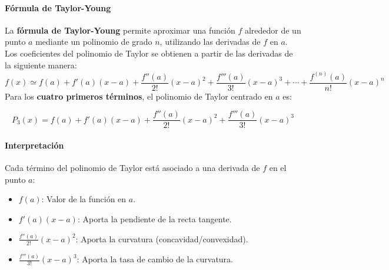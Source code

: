\documentclass[12pt, a4paper]{article}
\theoremstyle{rioplatense}
\begin{document}
\paragraph{Fórmula de Taylor-Young}
La \textbf{fórmula de Taylor-Young} permite aproximar una función \( f \) alrededor de un punto \( a \) mediante un polinomio de grado \( n \), utilizando las derivadas de \( f \) en \( a \). Los coeficientes del polinomio de Taylor se obtienen a partir de las derivadas de la siguiente manera:
\[
f(x) \simeq f(a) + f'(a)(x - a) + \frac{f''(a)}{2!}(x - a)^2 + \frac{f'''(a)}{3!}(x - a)^3 + \cdots + \frac{f^{(n)}(a)}{n!}(x - a)^n
\]
Para los \textbf{cuatro primeros términos}, el polinomio de Taylor centrado en \( a \) es:

\[
P_3(x) = f(a) + f'(a)(x - a) + \frac{f''(a)}{2!}(x - a)^2 + \frac{f'''(a)}{3!}(x - a)^3
\]

\paragraph{Interpretación}
Cada término del polinomio de Taylor está asociado a una derivada de \( f \) en el punto \( a \):
\begin{itemize}
    \item \( f(a) \): Valor de la función en \( a \).
    \item \( f'(a)(x - a) \): Aporta la pendiente de la recta tangente.
    \item \( \frac{f''(a)}{2!}(x - a)^2 \): Aporta la curvatura (concavidad/convexidad).
    \item \( \frac{f'''(a)}{3!}(x - a)^3 \): Aporta la tasa de cambio de la curvatura.
\end{itemize}
\end{document}
